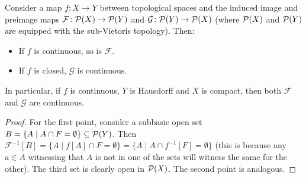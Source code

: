 	\begin{prop}
		\label{prop:subVcont}
		Consider a map $f\colon X\to Y$ between topological spaces and the induced image and preimage maps $\mathcal F\colon {\mathcal P}(X)\to {\mathcal P}(Y)$ and $\mathcal G\colon {\mathcal P}(Y)\to {\mathcal P}(X)$ (where ${\mathcal P}(X)$ and ${\mathcal P}(Y)$ are equipped with the sub-Vietoris topology). Then:
		\begin{itemize}
			\item
			If $f$ is continuous, so is $\mathcal F$.
			\item
			If $f$ is closed, $\mathcal G$ is continuous.
		\end{itemize}
		In particular, if $f$ is continuous, $Y$ is Hausdorff and $X$ is compact, then both $\mathcal F$ and $\mathcal G$ are continuous.\xqed{\lozenge}
	\end{prop}
	\begin{proof}
		For the first point, consider a subbasic open set $B=\{A \mid A\cap F=\emptyset \}\subseteq {\mathcal P}(Y)$. Then $\mathcal F^{-1}[B]=\{A \mid f[A]\cap F=\emptyset\}=\{A \mid A\cap f^{-1}[F]=\emptyset\}$ (this is because any $a\in A$ witnessing that $A$ is not in one of the sets will witness the same for the other). The third set is clearly open in ${\mathcal P}(X)$. The second point is analogous.
	\end{proof}
	
	
	

